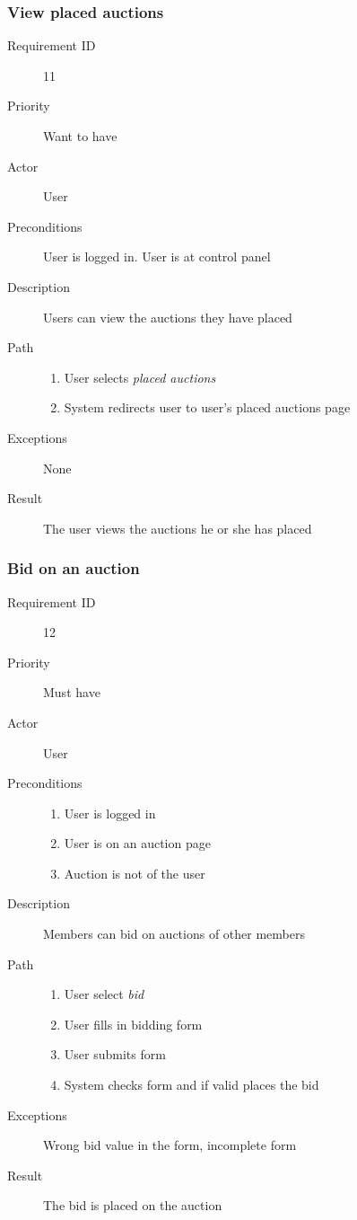 		\subsubsection{View placed auctions}
			\begin{description}
				\item[Requirement ID] 11
				\item[Priority] Want to have
				\item[Actor] User
				\item[Preconditions] User is logged in. User is at control panel
				\item[Description] Users can view the auctions they have placed
				\item[Path]
 					\begin{enumerate}
						\item User selects \emph{placed auctions}
						\item System redirects user to user's placed auctions page
					\end{enumerate}
				\item[Exceptions] None
				\item[Result] The user views the auctions he or she has placed
			\end{description}
		\subsubsection{Bid on an auction}
			\begin{description}
				\item[Requirement ID] 12
				\item[Priority] Must have
				\item[Actor] User
				\item[Preconditions] 
 					\begin{enumerate}
						\item User is logged in
						\item User is on an auction page
						\item Auction is not of the user
					\end{enumerate}
				\item[Description] Members can bid on auctions of other members
				\item[Path]
 					\begin{enumerate}
						\item User select \emph{bid}
						\item User fills in bidding form
						\item User submits form
						\item System checks form and if valid places the bid
					\end{enumerate}
				\item[Exceptions] Wrong bid value in the form, incomplete form
				\item[Result] The bid is placed on the auction
			\end{description}
